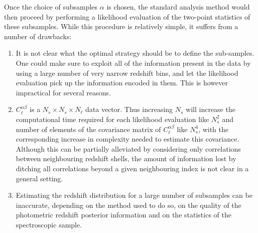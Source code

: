 \documentclass[twocolumn,amsfont,amssymb,amsmath, showpacs,balancelastpage, nofootinbib]{revtex4-1}
\begin{document}
    Once the choice of subsamples $\alpha$ is chosen, the standard analysis method would then proceed by performing a likelihood evaluation of the two-point statistics of these subsamples. While this procedure is relatively simple, it suffers from a number of drawbacks:
    \begin{enumerate}
      \item It is not clear what the optimal strategy should be to define the sub-samples. One could make sure to exploit all of the information present in the data by using a large number of very narrow redshift bins, and let the likelihood evaluation pick up the information encoded in them. This is however impractical for several reasons.
      \item $C^{\alpha\beta}_\ell$ is a $N_s\times N_s\times N_\ell$ data vector. Thus increasing $N_s$ will increase the computational time required for each likelihood evaluation like $N_s^2$ and number of elements of the covariance matrix of $C^{\alpha\beta}_\ell$ like $N_s^4$, with the corresponding increase in complexity needed to estimate this covariance. Although this can be partially alleviated by considering only correlations between neighbouring redshift shells, the amount of information lost by ditching all correlations beyond a given neighbouring index is not clear in a general setting.
      \item Estimating the redshift distribution for a large number of subsamples can be inaccurate, depending on the method used to do so, on the quality of the photometric redshift posterior information and on the statistics of the spectroscopic sample.
    \end{enumerate}
  
\end{document}
